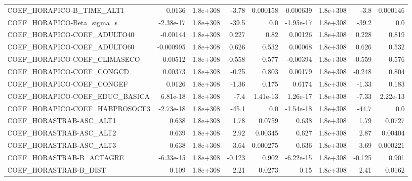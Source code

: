 \begin{tabular}{lrrrrrrrr}
COEF\_HORAPICO-B\_TIME\_ALT1         &      0.0136 &     1.8e+308 &     -3.78 & 0.000158 &   0.000639 &    1.8e+308 &         -3.8 &      0.000146 \\
COEF\_HORAPICO-Beta\_sigma\_s        &   -2.38e-17 &     1.8e+308 &     -39.5 &      0.0 &  -1.95e-17 &    1.8e+308 &        -39.2 &           0.0 \\
COEF\_HORAPICO-COEF\_ADULTO40       &    -0.00144 &     1.8e+308 &     0.227 &     0.82 &    0.00126 &    1.8e+308 &        0.228 &         0.819 \\
COEF\_HORAPICO-COEF\_ADULTO60       &   -0.000995 &     1.8e+308 &     0.626 &    0.532 &    0.00068 &    1.8e+308 &        0.626 &         0.532 \\
COEF\_HORAPICO-COEF\_CLIMASECO      &    -0.00512 &     1.8e+308 &    -0.558 &    0.577 &   -0.00394 &    1.8e+308 &       -0.559 &         0.576 \\
COEF\_HORAPICO-COEF\_CONGCD         &     0.00373 &     1.8e+308 &     -0.25 &    0.803 &    0.00179 &    1.8e+308 &       -0.248 &         0.804 \\
COEF\_HORAPICO-COEF\_CONGEF         &      0.0126 &     1.8e+308 &     -1.36 &    0.175 &     0.0174 &    1.8e+308 &        -1.33 &         0.183 \\
COEF\_HORAPICO-COEF\_EDUC\_BASICA    &    6.81e-18 &     1.8e+308 &      -7.4 & 1.41e-13 &   1.26e-17 &    1.8e+308 &        -7.33 &      2.22e-13 \\
COEF\_HORAPICO-COEF\_HABPROSOCF3    &   -2.73e-18 &     1.8e+308 &     -45.1 &      0.0 &  -1.54e-18 &    1.8e+308 &        -44.7 &           0.0 \\
COEF\_HORASTRAB-ASC\_ALT1           &       0.638 &     1.8e+308 &      1.78 &   0.0759 &      0.638 &    1.8e+308 &         1.79 &        0.0727 \\
COEF\_HORASTRAB-ASC\_ALT2           &       0.639 &     1.8e+308 &      2.92 &  0.00345 &      0.627 &    1.8e+308 &         2.87 &       0.00404 \\
COEF\_HORASTRAB-ASC\_ALT3           &       0.638 &     1.8e+308 &      3.64 & 0.000275 &      0.636 &    1.8e+308 &         3.69 &      0.000221 \\
COEF\_HORASTRAB-B\_ACTAGRE          &   -6.33e-15 &     1.8e+308 &    -0.123 &    0.902 &  -6.22e-15 &    1.8e+308 &       -0.125 &         0.901 \\
COEF\_HORASTRAB-B\_DIST             &       0.109 &     1.8e+308 &      2.21 &   0.0273 &       0.15 &    1.8e+308 &         2.41 &        0.0162 \\

\end{tabular}
